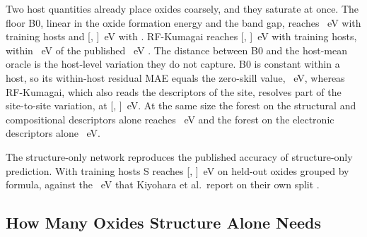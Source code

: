 Two host quantities already place oxides coarsely, and they saturate at once. The floor B0, linear in the oxide formation energy and the band gap, reaches \numNetTwentyFiveMaeBZero{}~eV with \numCfgBudgetsHostsItemOne{} training hosts and \numNetSixHundredFiftyFourMaeBZero{} [\numNetSixHundredFiftyFourMaeBZeroLo{}, \numNetSixHundredFiftyFourMaeBZeroHi{}]~eV with \numCfgBudgetsMax{}. RF-Kumagai reaches \numNetSixHundredFiftyFourMaeRf{} [\numNetSixHundredFiftyFourMaeRfLo{}, \numNetSixHundredFiftyFourMaeRfHi{}]~eV with \numCfgBudgetsMax{} training hosts, within \numBaselinesSummaryRfKumagaiVsPublishedDifferenceEV{}~eV of the published \numBaselinesSummaryRfKumagaiVsPublishedPublishedEV{}~eV \citep{Kumagai2021insights}. The distance between B0 and the host-mean oracle is the host-level variation they do not capture. B0 is constant within a host, so its within-host residual MAE equals the zero-skill value, \numBaselinesSummaryOuterFullBudgetBZeroWithinHostMaeMean{}~eV, whereas RF-Kumagai, which also reads the descriptors of the site, resolves part of the site-to-site variation, at \numBaselinesSummaryOuterFullBudgetRfKumagaiWithinHostMaeMean{} [\numBaselinesSummaryOuterFullBudgetRfKumagaiWithinHostMaeCiLo{}, \numBaselinesSummaryOuterFullBudgetRfKumagaiWithinHostMaeCiHi{}]~eV. At the same size the forest on the structural and compositional descriptors alone reaches \numBaselinesSummaryOuterFullBudgetRfStructuralMaeMean{}~eV and the forest on the electronic descriptors alone \numBaselinesSummaryOuterFullBudgetRfElectronicMaeMean{}~eV.

The structure-only network reproduces the published accuracy of structure-only prediction. With \numCfgBudgetsMax{} training hosts S reaches \numNetSixHundredFiftyFourMaeS{} [\numNetSixHundredFiftyFourMaeSLo{}, \numNetSixHundredFiftyFourMaeSHi{}]~eV on held-out oxides grouped by formula, against the \numNetPublishedMae{}~eV that Kiyohara et al.\ report on their own split \citep{Kiyohara2025machinelearning}.

\subsection{How Many Oxides Structure Alone Needs}
\label{sec:learning_curves}

